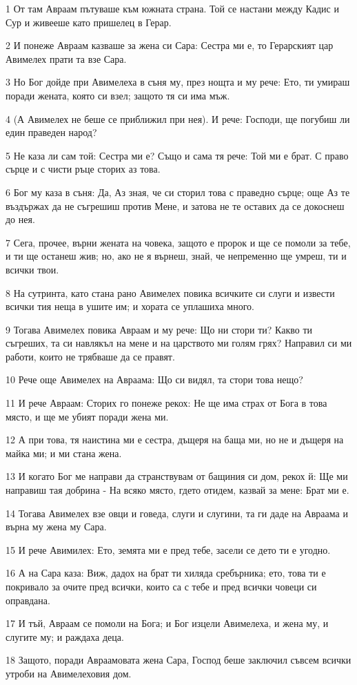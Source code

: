 \par 1 От там Авраам пътуваше към южната страна. Той се настани между Кадис и Сур и живееше като пришелец в Герар.
\par 2 И понеже Авраам казваше за жена си Сара: Сестра ми е, то Герарският цар Авимелех прати та взе Сара.
\par 3 Но Бог дойде при Авимелеха в съня му, през нощта и му рече: Ето, ти умираш поради жената, която си взел; защото тя си има мъж.
\par 4 (А Авимелех не беше се приближил при нея). И рече: Господи, ще погубиш ли един праведен народ?
\par 5 Не каза ли сам той: Сестра ми е? Също и сама тя рече: Той ми е брат. С право сърце и с чисти ръце сторих аз това.
\par 6 Бог му каза в съня: Да, Аз зная, че си сторил това с праведно сърце; още Аз те въздържах да не съгрешиш против Мене, и затова не те оставих да се докоснеш до нея.
\par 7 Сега, прочее, върни жената на човека, защото е пророк и ще се помоли за тебе, и ти ще останеш жив; но, ако не я върнеш, знай, че непременно ще умреш, ти и всички твои.
\par 8 На сутринта, като стана рано Авимелех повика всичките си слуги и извести всички тия неща в ушите им; и хората се уплашиха много.
\par 9 Тогава Авимелех повика Авраам и му рече: Що ни стори ти? Какво ти съгреших, та си навлякъл на мене и на царството ми голям грях? Направил си ми работи, които не трябваше да се правят.
\par 10 Рече още Авимелех на Авраама: Що си видял, та стори това нещо?
\par 11 И рече Авраам: Сторих го понеже рекох: Не ще има страх от Бога в това място, и ще ме убият поради жена ми.
\par 12 А при това, тя наистина ми е сестра, дъщеря на баща ми, но не и дъщеря на майка ми; и ми стана жена.
\par 13 И когато Бог ме направи да странствувам от бащиния си дом, рекох й: Ще ми направиш тая добрина - На всяко място, гдето отидем, казвай за мене: Брат ми е.
\par 14 Тогава Авимелех взе овци и говеда, слуги и слугини, та ги даде на Авраама и върна му жена му Сара.
\par 15 И рече Авимилех: Ето, земята ми е пред тебе, засели се дето ти е угодно.
\par 16 А на Сара каза: Виж, дадох на брат ти хиляда сребърника; ето, това ти е покривало за очите пред всички, които са с тебе и пред всички човеци си оправдана.
\par 17 И тъй, Авраам се помоли на Бога; и Бог изцели Авимелеха, и жена му, и слугите му; и раждаха деца.
\par 18 Защото, поради Авраамовата жена Сара, Господ беше заключил съвсем всички утроби на Авимелеховия дом.

